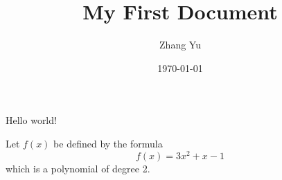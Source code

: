 \documentclass{article} %
\title{My First Document}
\author{Zhang Yu}
\date{\today}
\begin{document}
    \maketitle

    Hello world!

    Let $f(x)$ be defined by the formula $$f(x)=3x^2+x-1$$ which is a polynomial
    of degree 2.
\end{document}
